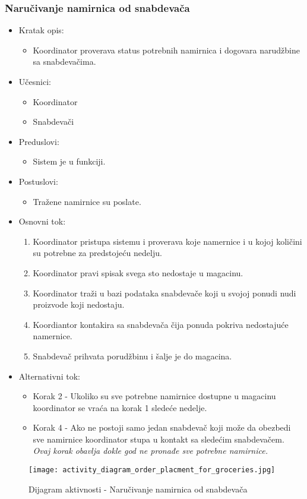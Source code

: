 

\subsubsection{Naručivanje namirnica od snabdevača}


\begin{itemize}
	\item Kratak opis:
		\begin{itemize}
			\item Koordinator proverava status potrebnih namirnica i dogovara narudžbine sa snabdevačima.
		\end{itemize}
	\item Učesnici:
		\begin{itemize}
		    \item Koordinator
		    \item Snabdevači
		\end{itemize}
	\item Preduslovi:
		\begin{itemize}
		   
		    \item Sistem je u funkciji.
		\end{itemize}
	\item Postuslovi:
		\begin{itemize}
			\item Tražene namirnice su poslate.
	\end{itemize}
	\item Osnovni tok:
		\begin{enumerate}
            \item	Koordinator pristupa sistemu i proverava koje namernice i u kojoj količini su potrebne za predstojeću nedelju.
           \item Koordinator pravi spisak svega sto nedostaje u magacinu.
            \item Koordinator traži u bazi podataka snabdevače koji u svojoj ponudi nudi proizvode koji nedostaju.
             \item  Koordiantor kontakira sa snabdevača čija ponuda pokriva nedostajuće namernice.
            \item Snabdevač prihvata porudžbinu i šalje je do magacina.
		\end{enumerate}
	\item Alternativni tok:
		\begin{itemize}
		    \item Korak 2 - Ukoliko su sve potrebne namirnice dostupne u magacinu koordinator se vraća na korak 1 sledeće nedelje.
		    \item Korak 4 - Ako ne postoji samo jedan snabdevač koji može da obezbedi sve namirnice koordinator stupa u kontakt sa sledećim snabdevačem. \textit{Ovaj korak obavlja dokle god ne pronađe sve potrebne namirnice.}
		\end{itemize}
\end{itemize}

\begin{figure}[H]
\begin{center}
\texttt{[image: activity\_diagram\_order\_placment\_for\_groceries.jpg]}
\end{center}
    \caption{Dijagram aktivnosti - Naručivanje namirnica od snabdevača}
\label{fig:Activity_diagram_order_placment_for_groceries}
\end{figure}
